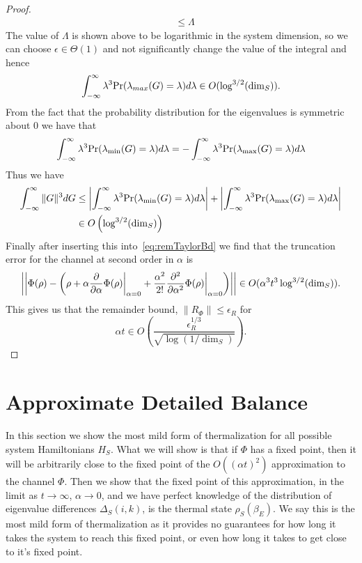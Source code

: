 \documentclass{article}
\newcommand{\norm}[1]{\left| \left| #1 \right| \right|}
\newcommand{\bigo}[1]{O\left( #1 \right)}
\begin{document}
\begin{proof}
\begin{align}
    &\le \Lambda
\end{align}
The value of $\Lambda$ is shown above to be logarithmic in the system dimension, so we can choose $\epsilon \in \Theta(1)$ and not significantly change the value of the integral and hence
\begin{equation}
    \int_{-\infty}^\infty \lambda^3 {\rm Pr}(\lambda_{max}(G) = \lambda) d\lambda \in O(\log^{3/2}(\dim_S)).
\end{equation}
From the fact that the probability distribution for the eigenvalues is symmetric about $0$ we have that
\begin{equation}
    \int_{-\infty}^\infty \lambda^3 {\rm Pr}(\lambda_{\min}(G) = \lambda) d\lambda = - \int_{-\infty}^\infty \lambda^3 {\rm Pr}(\lambda_{\max}(G) = \lambda) d\lambda
\end{equation}
Thus we have 
\begin{align}
    \int_{-\infty}^\infty \|G\|^3 dG &\le \left|\int_{-\infty}^\infty \lambda^3 {\rm Pr}(\lambda_{\min}(G) = \lambda) d\lambda \right| + \left|\int_{-\infty}^\infty \lambda^3 {\rm Pr}(\lambda_{\max}(G) = \lambda) d\lambda \right|\nonumber\\
    &\in O\left(\log^{3/2}(\dim_S) \right)
\end{align}
Finally after inserting this into~\eqref{eq:remTaylorBd} we find that the truncation error for the channel at second order in $\alpha$ is
\begin{equation}
    \norm{\Phi(\rho) - \left(\rho + {\alpha} \frac{\partial}{\partial \alpha} \Phi(\rho) \bigg|_{\alpha = 0} + \frac{\alpha^2}{2!} \frac{\partial^2}{\partial \alpha^2} \Phi(\rho) \bigg|_{\alpha = 0} \right)} \in O(\alpha^3 t^3 \log^{3/2}({\rm dim}_S)).
\end{equation}
This gives us that the remainder bound, $\|R_\Phi\|\le \epsilon_R$ for 
\begin{equation}
    \alpha t \in O\left(\frac{\epsilon_R^{1/3}}{\sqrt{\log(1/\dim_S)}} \right).
\end{equation}
\end{proof}

\section{Approximate Detailed Balance}
In this section we show the most mild form of thermalization for all possible system Hamiltonians $H_S$. What we will show is that if $\Phi$ has a fixed point, then it will be arbitrarily close to the fixed point of the $\bigo{(\alpha t)^2}$ approximation to the channel $\Phi$. Then we show that the fixed point of this approximation, in the limit as $t \to \infty$, $\alpha \to 0$, and we have perfect knowledge of the distribution of eigenvalue differences $\Delta_S(i,k)$, is the thermal state $\rho_S(\beta_E)$. We say this is the most mild form of thermalization as it provides no guarantees for how long it takes the system to reach this fixed point, or even how long it takes to get close to it's fixed point. 
\end{document}
